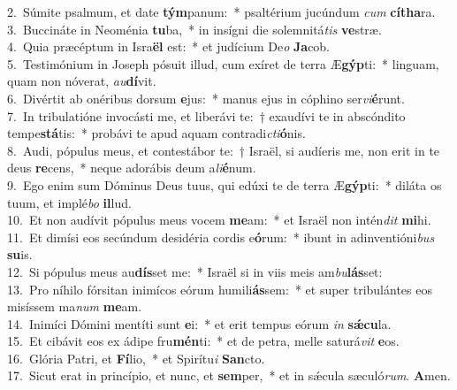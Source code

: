 {2.~}Súmite psalmum, et date \textbf{tým}panum:~* psaltérium jucúndum \textit{cum} \textbf{cí}\textbf{tha}ra.\\
{3.~}Buccináte in Neoménia \textbf{tu}ba,~* in insígni die solemnitá\textit{tis} \textbf{ve}stræ.\\
{4.~}Quia præcéptum in Isra\textbf{ël} est:~* et judícium De\textit{o} \textbf{Ja}cob.\\
{5.~}Testimónium in Joseph pósuit illud, cum exíret de terra Æ\textbf{gýp}ti:~* linguam, quam non nóverat, \textit{au}\textbf{dí}vit.\\
{6.~}Divértit ab onéribus dorsum \textbf{e}jus:~* manus ejus in cóphino ser\textit{vi}\textbf{é}runt.\\
{7.~}In tribulatióne invocásti me, et liberávi te:~† exaudívi te in abscóndito tempe\textbf{stá}tis:~* probávi te apud aquam contradi\textit{cti}\textbf{ó}nis.\\
{8.~}Audi, pópulus meus, et contestábor te:~† Israël, si audíeris me, non erit in te deus \textbf{re}cens,~* neque adorábis deum a\textit{li}\textbf{é}num.\\
{9.~}Ego enim sum Dóminus Deus tuus, qui edúxi te de terra Æ\textbf{gýp}ti:~* diláta os tuum, et implé\textit{bo} \textbf{il}lud.\\
{10.~}Et non audívit pópulus meus vocem \textbf{me}am:~* et Israël non intén\textit{dit} \textbf{mi}hi.\\
{11.~}Et dimísi eos secúndum desidéria cordis e\textbf{ó}rum:~* ibunt in adinventióni\textit{bus} \textbf{su}is.\\
{12.~}Si pópulus meus au\textbf{dís}set me:~* Israël si in viis meis am\textit{bu}\textbf{lás}set:\\
{13.~}Pro níhilo fórsitan inimícos eórum humili\textbf{ás}sem:~* et super tribulántes eos misíssem ma\textit{num} \textbf{me}am.\\
{14.~}Inimíci Dómini mentíti sunt \textbf{e}i:~* et erit tempus eórum \textit{in} \textbf{sǽ}\textbf{cu}la.\\
{15.~}Et cibávit eos ex ádipe fru\textbf{mén}ti:~* et de petra, melle saturá\textit{vit} \textbf{e}os.\\
{16.~}Glória Patri, et \textbf{Fí}lio,~* et Spirítu\textit{i} \textbf{San}cto.\\
{17.~}Sicut erat in princípio, et nunc, et \textbf{sem}per,~* et in sǽcula sæculó\textit{rum}. \textbf{A}men.\\

